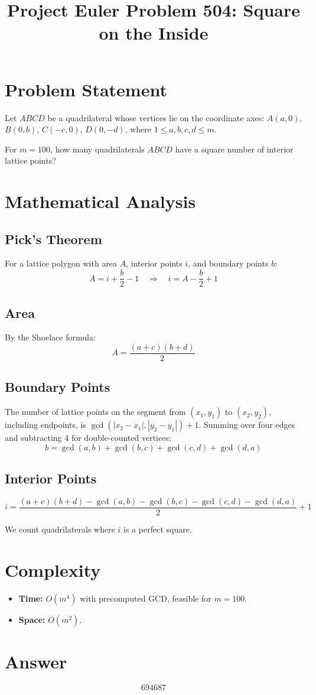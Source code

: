 \documentclass[12pt]{article}
\title{Project Euler Problem 504: Square on the Inside}
\author{}
\date{}
\begin{document}
\maketitle

\section{Problem Statement}
Let $ABCD$ be a quadrilateral whose vertices lie on the coordinate axes: $A(a,0)$, $B(0,b)$, $C(-c,0)$, $D(0,-d)$, where $1 \le a,b,c,d \le m$.

For $m = 100$, how many quadrilaterals $ABCD$ have a square number of interior lattice points?

\section{Mathematical Analysis}

\subsection{Pick's Theorem}
For a lattice polygon with area $A$, interior points $i$, and boundary points $b$:
\[
A = i + \frac{b}{2} - 1 \quad \Longrightarrow \quad i = A - \frac{b}{2} + 1
\]

\subsection{Area}
By the Shoelace formula:
\[
A = \frac{(a+c)(b+d)}{2}
\]

\subsection{Boundary Points}
The number of lattice points on the segment from $(x_1,y_1)$ to $(x_2,y_2)$, including endpoints, is $\gcd(|x_2-x_1|,|y_2-y_1|) + 1$. Summing over four edges and subtracting 4 for double-counted vertices:
\[
b = \gcd(a,b) + \gcd(b,c) + \gcd(c,d) + \gcd(d,a)
\]

\subsection{Interior Points}
\[
i = \frac{(a+c)(b+d) - \gcd(a,b) - \gcd(b,c) - \gcd(c,d) - \gcd(d,a)}{2} + 1
\]

We count quadrilaterals where $i$ is a perfect square.

\section{Complexity}
\begin{itemize}
    \item \textbf{Time:} $O(m^4)$ with precomputed GCD, feasible for $m = 100$.
    \item \textbf{Space:} $O(m^2)$.
\end{itemize}

\section{Answer}

\[
\boxed{694687}
\]
\end{document}
